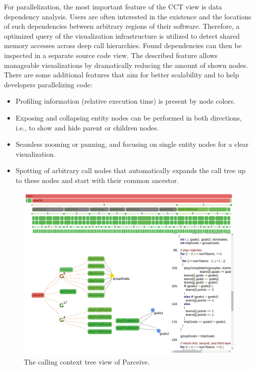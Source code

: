 For parallelization, the most important feature of the CCT view is data
dependency analysis. Users are often interested in the existence and the
locations of such dependencies between arbitrary regions of their software.
Therefore, a optimized query of the visualization infrastructure is utilized
to detect shared memory accesses across deep call hierarchies. Found
dependencies can then be inspected in a separate source code view. The
described feature allows manageable visualizations by dramatically reducing the
amount of shown nodes. There are some additional features that aim for better
scalability and to help developers parallelizing code:

\begin{itemize}
	\item Profiling information (relative execution time) is present by node
colors.
	\item Exposing and collapsing entity nodes can be performed in both
directions, i.e., to show and hide parent or children nodes.
	\item Seamless zooming or panning, and focusing on single entity nodes for
a clear visualization.
	\item Spotting of arbitrary call nodes that automatically expands the call
tree up to these nodes and start with their common ancestor.
\end{itemize}

\begin{figure}[h!]
\includegraphics[clip, trim=0.9cm 2.5cm 8.5cm 8.5cm,
width=\linewidth]{img/cct_view}
\caption{The calling context tree view of Parceive.}
\label{fig:cct_view}	
\end{figure}


